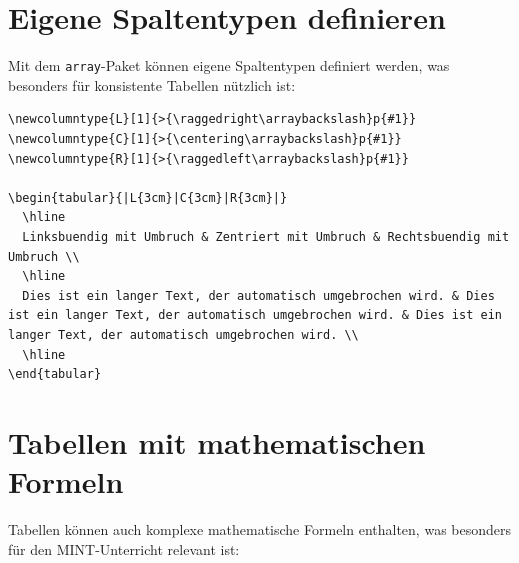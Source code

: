 \documentclass[12pt,a4paper]{article}
\begin{document}
\section{Eigene Spaltentypen definieren}

Mit dem \texttt{array}-Paket können eigene Spaltentypen definiert werden, was besonders für konsistente Tabellen nützlich ist:

\begin{lstlisting}[style=latex]
\newcolumntype{L}[1]{>{\raggedright\arraybackslash}p{#1}}
\newcolumntype{C}[1]{>{\centering\arraybackslash}p{#1}}
\newcolumntype{R}[1]{>{\raggedleft\arraybackslash}p{#1}}

\begin{tabular}{|L{3cm}|C{3cm}|R{3cm}|}
  \hline
  Linksbuendig mit Umbruch & Zentriert mit Umbruch & Rechtsbuendig mit Umbruch \\
  \hline
  Dies ist ein langer Text, der automatisch umgebrochen wird. & Dies ist ein langer Text, der automatisch umgebrochen wird. & Dies ist ein langer Text, der automatisch umgebrochen wird. \\
  \hline
\end{tabular}
\end{lstlisting}


\section{Tabellen mit mathematischen Formeln}

Tabellen können auch komplexe mathematische Formeln enthalten, was besonders für den MINT-Unterricht relevant ist:
\end{document}
